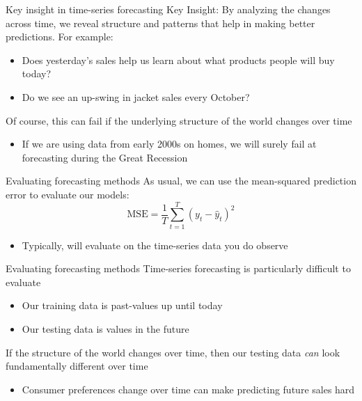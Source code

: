 \documentclass[aspectratio=169,t,11pt,table]{beamer}
\begin{document}
\begin{frame}{Key insight in time-series forecasting}
  \alert{Key Insight}: By analyzing the changes across time, we reveal structure and patterns that help in making better predictions. 
  For example:
  \begin{itemize}
    \item Does yesterday's sales help us learn about what products people will buy today?
    \item Do we see an up-swing in jacket sales every October?
  \end{itemize}
  
  \pause
  \bigskip
  Of course, this can fail if the underlying structure of the world changes over time
  \begin{itemize}
    \item If we are using data from early 2000s on homes, we will surely fail at forecasting during the Great Recession
  \end{itemize}  
\end{frame}

\begin{frame}{Evaluating forecasting methods}
  As usual, we can use the mean-squared prediction error to evaluate our models:
  $$
    \text{MSE} = \frac{1}{T} \sum_{t=1}^T (y_t - \hat{y}_t)^2
  $$

  \begin{itemize}
    \item Typically, will evaluate on the time-series data you do observe
  \end{itemize}
\end{frame}

\begin{frame}{Evaluating forecasting methods}
  Time-series forecasting is particularly difficult to evaluate
  \begin{itemize}
    \item Our training data is past-values up until today
    \item Our testing data is values in the future
  \end{itemize}

  \bigskip
  If the structure of the world changes over time, then our testing data \emph{can} look fundamentally different over time
  \begin{itemize}
    \item Consumer preferences change over time can make predicting future sales hard
  \end{itemize}
\end{frame}
\end{document}
